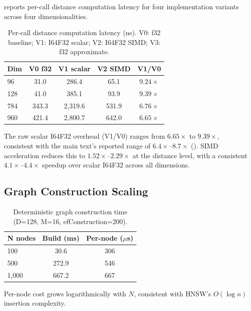 \documentclass[10pt,journal]{IEEEtran}
\newcommand{\hnsw}{\textsc{HNSW}}
\begin{document}
 reports per-call distance computation latency for four implementation variants across four dimensionalities.

\begin{table}[h]
  \centering
  \caption{Per-call distance computation latency (ns). V0: f32 baseline; V1: I64F32 scalar; V2: I64F32 SIMD; V3: f32 approximate.}
  \label{tab:bench_distance}
  \footnotesize
  \begin{tabular}{lcccc}
    \toprule
    \textbf{Dim} & \textbf{V0 f32} & \textbf{V1 scalar} & \textbf{V2 SIMD} & \textbf{V1/V0} \\
    \midrule
    96  & 31.0 & 286.4 & 65.1 & $9.24\times$ \\
    128 & 41.0 & 385.1 & 93.9 & $9.39\times$ \\
    784 & 343.3 & 2{,}319.6 & 531.9 & $6.76\times$ \\
    960 & 421.4 & 2{,}800.7 & 642.0 & $6.65\times$ \\
    \bottomrule
  \end{tabular}
\end{table}

The raw scalar I64F32 overhead (V1/V0) ranges from $6.65\times$ to $9.39\times$, consistent with the main text's reported range of $6.4\times$--$8.7\times$ (). SIMD acceleration reduces this to $1.52\times$--$2.29\times$ at the distance level, with a consistent $4.1\times$--$4.4\times$ speedup over scalar I64F32 across all dimensions.

\subsection{Graph Construction Scaling}

\begin{table}[h]
  \centering
  \caption{Deterministic graph construction time (D=128, M=16, efConstruction=200).}
  \label{tab:bench_build}
  \begin{tabular}{lcc}
    \toprule
    \textbf{N nodes} & \textbf{Build (ms)} & \textbf{Per-node ($\mu$s)} \\
    \midrule
    100   & 30.6  & 306  \\
    500   & 272.9 & 546  \\
    1{,}000 & 667.2 & 667  \\
    \bottomrule
  \end{tabular}
\end{table}

Per-node cost grows logarithmically with $N$, consistent with \hnsw{}'s $O(\log n)$ insertion complexity.
\end{document}
